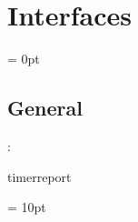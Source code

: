 
\section{Interfaces} 


\parskip = 0pt

\vspace{3mm} \subsection*{General}

: 

timerreport
\vspace{2mm}

\vspace{5mm}\parskip = 10pt 
